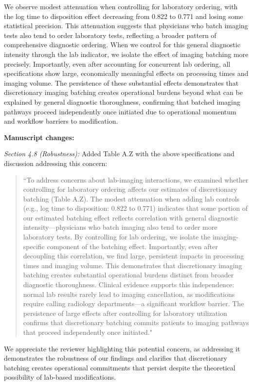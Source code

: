 \documentclass[11pt]{article}
\newcommand{\1}{\hbox{\rm 1\kern-.35em 1}}
\begin{document}
{We observe modest attenuation when controlling for laboratory ordering, with the log time to disposition effect decreasing from 0.822 to 0.771 and losing some statistical precision. This attenuation suggests that physicians who batch imaging tests also tend to order laboratory tests, reflecting a broader pattern of comprehensive diagnostic ordering. When we control for this general diagnostic intensity through the lab indicator, we isolate the effect of imaging batching more precisely. Importantly, even after accounting for concurrent lab ordering, all specifications show large, economically meaningful effects on processing times and imaging volume. The persistence of these substantial effects demonstrates that discretionary imaging batching creates operational burdens beyond what can be explained by general diagnostic thoroughness, confirming that batched imaging pathways proceed independently once initiated due to operational momentum and workflow barriers to modification.

\textbf{Manuscript changes:}

\textit{Section 4.8 (Robustness):} Added Table A.Z with the above specifications and 
discussion addressing this concern:
\begin{quote}
``To address concerns about lab-imaging interactions, we examined whether controlling for laboratory ordering affects our estimates of discretionary batching (Table A.Z). The modest attenuation when adding lab controls (e.g., log time to disposition: 0.822 to 0.771) indicates that some portion of our estimated batching effect reflects correlation with general diagnostic intensity—physicians who batch imaging also tend to order more laboratory tests. By controlling for lab ordering, we isolate the imaging-specific component of the batching effect. Importantly, even after decoupling this correlation, we find large, persistent impacts in processing times and imaging volume. This demonstrates that discretionary imaging batching creates substantial operational burdens distinct from broader diagnostic thoroughness. Clinical evidence supports this independence: normal lab results rarely lead to imaging cancellation, as modifications require calling radiology departments—a significant workflow barrier. The persistence of large effects after controlling for laboratory utilization confirms that discretionary batching commits patients to imaging pathways that proceed independently once initiated."
\end{quote}

We appreciate the reviewer highlighting this potential concern, as addressing it demonstrates the robustness of our findings and clarifies that discretionary batching creates operational commitments that persist despite the theoretical possibility of lab-based modifications.

}
\end{document}
